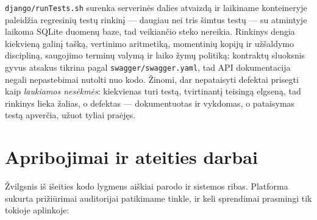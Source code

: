 \documentclass[11pt,a4paper]{article}
\newcommand{\code}[1]{\texttt{#1}}
\begin{document}
\code{django/runTests.sh} surenka serverinės dalies atvaizdą ir
laikiname konteineryje paleidžia regresinių testų rinkinį — daugiau
nei tris šimtus testų — su atmintyje laikoma SQLite duomenų baze, tad
veikiančio steko nereikia. Rinkinys dengia kiekvieną galinį tašką,
vertinimo aritmetiką, momentinių kopijų ir užšaldymo discipliną,
saugojimo terminų valymą ir laiko žymų politiką; kontraktų sluoksnis
gyvus atsakus tikrina pagal \code{swagger/swagger.yaml}, tad API
dokumentacija negali nepastebimai nutolti nuo kodo. Žinomi, dar
nepataisyti defektai prisegti kaip \emph{laukiamos nesėkmės}:
kiekvienas turi testą, tvirtinantį teisingą elgseną, tad rinkinys
lieka žalias, o defektas — dokumentuotas ir vykdomas, o pataisymas
testą apverčia, užuot tyliai praėjęs.

\section{Apribojimai ir ateities darbai}
\label{sec:limitations}

Žvilgsnis iš išeities kodo lygmens aiškiai parodo ir sistemos ribas.
Platforma sukurta prižiūrimai auditorijai patikimame tinkle, ir keli
sprendimai prasmingi tik tokioje aplinkoje:
\end{document}
